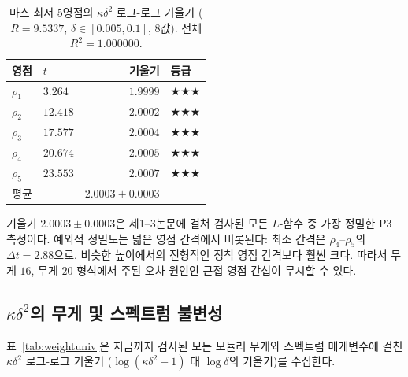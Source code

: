\documentclass[11pt, a4paper]{article}
\theoremstyle{plain}
\theoremstyle{definition}
\begin{document}
\begin{table}[ht]
\centering
\caption{마스 최저 5영점의 $\kappa\delta^{2}$ 로그-로그 기울기
  ($R=9.5337$, $\delta\in[0.005,0.1]$, 8값). 전체 $R^{2}=1.000000$.}
\label{tab:maass_kd2}
\small
\begin{tabular}{llrl}
\toprule
영점 & $t$ & 기울기 & 등급 \\
\midrule
$\rho_1$ & $3.264$ & $1.9999$ & $\bigstar\bigstar\bigstar$ \\
$\rho_2$ & $12.418$ & $2.0002$ & $\bigstar\bigstar\bigstar$ \\
$\rho_3$ & $17.577$ & $2.0004$ & $\bigstar\bigstar\bigstar$ \\
$\rho_4$ & $20.674$ & $2.0005$ & $\bigstar\bigstar\bigstar$ \\
$\rho_5$ & $23.553$ & $2.0007$ & $\bigstar\bigstar\bigstar$ \\
\midrule
평균 & & $2.0003\pm 0.0003$ & \\
\bottomrule
\end{tabular}
\end{table}

기울기 $2.0003\pm 0.0003$은 제1--3논문에 걸쳐 검사된 모든 $L$-함수 중
가장 정밀한 P3 측정이다. 예외적 정밀도는 넓은 영점 간격에서 비롯된다:
최소 간격은 $\rho_4$--$\rho_5$의 $\Delta t=2.88$으로,
비슷한 높이에서의 전형적인 정칙 영점 간격보다 훨씬 크다.
따라서 무게-$16$, 무게-$20$ 형식에서 주된 오차 원인인
근접 영점 간섭이 무시할 수 있다.

\subsection{$\kappa\delta^{2}$의 무게 및 스펙트럼 불변성}
\label{ssec:weightinv}

표~\ref{tab:weightuniv}은 지금까지 검사된 모든 모듈러 무게와 스펙트럼 매개변수에
걸친 $\kappa\delta^{2}$ 로그-로그 기울기
($\log(\kappa\delta^{2}-1)$ 대 $\log\delta$의 기울기)를 수집한다.
\end{document}
